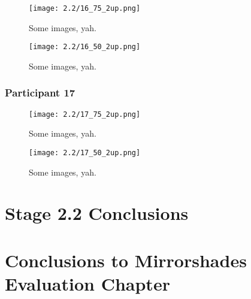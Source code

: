 \begin{figure}[h]
	\begin{center}
	\texttt{[image: 2.2/16\_75\_2up.png]}
	\caption{Some images, yah.}
	\end{center}
\end{figure}

\clearpage

\begin{figure}[h]
	\begin{center}
	\texttt{[image: 2.2/16\_50\_2up.png]}
	\caption{Some images, yah.}
	\end{center}
\end{figure}


\clearpage

\subsubsection{Participant 17}

\begin{figure}[h]
	\begin{center}
	\texttt{[image: 2.2/17\_75\_2up.png]}
	\caption{Some images, yah.}
	\end{center}
\end{figure}

\clearpage

\begin{figure}[h]
	\begin{center}
	\texttt{[image: 2.2/17\_50\_2up.png]}
	\caption{Some images, yah.}
	\end{center}
\end{figure}


\section{Stage 2.2 Conclusions}


\section{Conclusions to Mirrorshades Evaluation Chapter}


